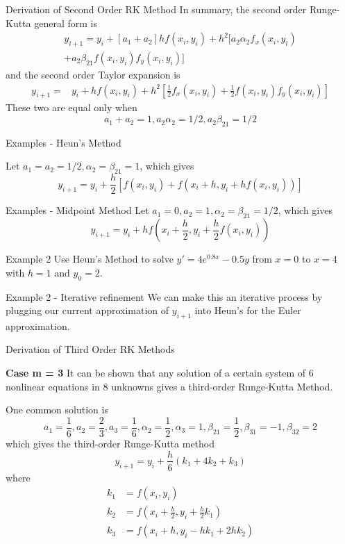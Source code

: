 \documentclass[12pt]{beamer}
\begin{document}
\begin{frame}{Derivation of Second Order RK Method}  
In summary, the second order Runge-Kutta general form is
\begin{align*} 
y_{i+1} = y_i + [a_1 + a_2] h f(x_i, y_i) + h^2 [ a_2 \alpha_2 f_x(x_i,y_i) \\
+ a_2 \beta_{21}f(x_i,y_i)f_y(x_i,y_i)]
\end{align*}
and the second order Taylor expansion is
\begin{align*} 
y_{i+1} =& y_i + h f(x_i, y_i) + h^2[\frac{1}{2}f_x(x_i,y_i) + \frac{1}{2}f(x_i,y_i) f_y(x_i,y_i)]
\end{align*}
These two are equal only when \[a_1+a_2=1, a_2 \alpha_2=1/2,a_2 \beta_{21}=1/2\]
\end{frame} 

\begin{frame}{Examples - Heun's Method} 

Let $a_1=a_2=1/2,\alpha_2=\beta_{21}=1$, which gives
\[
y_{i+1}=y_i+\frac{h}{2}\left[f(x_i,y_i)+f(x_i+h,y_i+hf(x_i,y_i))\right]
\]
\vspace{3 in}
\end{frame} 

\begin{frame}{Examples - Midpoint Method} 
Let $a_1=0,a_2=1,\alpha_2=\beta_{21}=1/2$, which gives
\[
y_{i+1}=y_i+hf(x_i+\frac{h}{2},y_i+\frac{h}{2}f(x_i,y_i))
\]
\vspace{3 in}
\end{frame} 

\begin{frame}{Example 2} 
Use Heun's Method to solve $y'=4e^{0.8x}-0.5y$ from $x=0$ to $x=4$ with $h=1$ and $y_0=2$.
\vspace{3 in}
\end{frame} 

\begin{frame}{Example 2 - Iterative refinement} 
We can make this an iterative process by plugging our current approximation of $y_{i+1}$ into Heun's for the Euler approximation.
\vspace{3 in}
\end{frame} 

\begin{frame}{Derivation of Third Order RK Methods}  

{\bf Case  m = 3}
It can be shown that any solution of a certain system of 6 nonlinear equations in 8 unknowns gives a third-order Runge-Kutta Method.

One common solution is
\[
a_1=\frac{1}{6}, a_2=\frac{2}{3}, a_3=\frac{1}{6}, \alpha_2=\frac{1}{2}, \alpha_3=1, \beta_{21}=\frac{1}{2}, \beta_{31}=-1, \beta_{32}=2
\]
which gives the third-order Runge-Kutta method
\[
y_{i+1}=y_i+\frac{h}{6}(k_1+4k_2+k_3)
\]
where
\begin{align*}
k_1 &= f(x_i,y_i) \\
k_2 & = f\left(x_i+\frac{h}{2},y_i+\frac{h}{2}k_1\right) \\
k_3 &= f(x_i+h,y_i-hk_1+2hk_2)
\end{align*}
\end{frame} 
\end{document}
